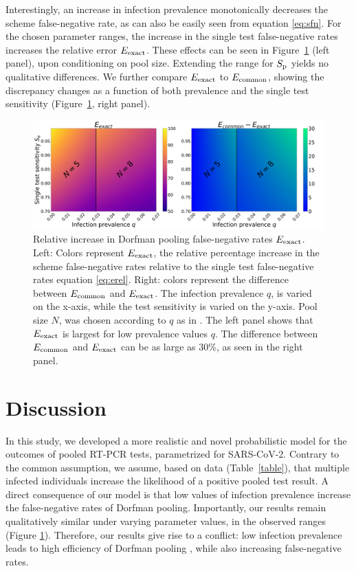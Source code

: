 \documentclass{article}
\begin{document}
Interestingly, an increase in infection prevalence monotonically
decreases the scheme false-negative rate, as can also be easily seen
from equation \eqref{eq:sfn}. For the chosen parameter ranges, the increase in
the single test false-negative rates increases the relative error
$E_{\text{{exact}}}$. These effects can be seen in Figure~\ref{fig1} (left
panel), upon conditioning on pool size. Extending the range for $S_\text{p}$
yields no qualitative differences. We further compare $E_{\text{{exact}}}$ to
$E_{\text{{common}}}$, showing the discrepancy changes as a function of both
prevalence and the single test sensitivity (Figure~\ref{fig1}, right
panel).
\begin{figure}[H]
  \centering
  \includegraphics[width=\textwidth]{heatmap_sfn.jpg}
  \caption{Relative increase in Dorfman pooling false-negative rates
    $E_{\text{{exact}}}$. Left: Colors represent $E_{\text{{exact}}}$, the relative
    percentage increase in the scheme false-negative rates relative to
    the single test false-negative rates equation \eqref{eq:erel}. Right:
    colors represent the difference between $E_{\text{{common}}}$ and
    $E_{\text{{exact}}}$. The infection prevalence $q$, is varied on the
    x-axis, while the test sensitivity is varied on the y-axis. Pool
    size $N$, was chosen according to $q$ as in
    \cite{DorfmanYuvalDor}. The left panel shows that $E_{\text{{exact}}}$ is
    largest for low prevalence values $q$. The difference between
    $E_{\text{{common}}}$ and $E_{\text{{exact}}}$ can be as large as 30\%, as seen
    in the right panel. }\label{fig1}
\end{figure}

\section*{Discussion}
In this study, we developed a more realistic and novel probabilistic
model for the outcomes of pooled RT-PCR tests, parametrized for
SARS-CoV-2. Contrary to the common assumption, we assume, based on
data (Table~\ref{table}), that multiple infected individuals increase
the likelihood of a positive pooled test result. A direct consequence
of our model is that low values of infection prevalence increase the
false-negative rates of Dorfman pooling. Importantly, our results
remain qualitatively similar under varying parameter values, in the
observed ranges \cite{KitComparison,EstimatingRatesKucrika,
  EstimatingRatesLourenco, InterpretingCOVID19Test} (Figure
\ref{fig1}). Therefore, our results give rise to a conflict: low
infection prevalence leads to high efficiency of Dorfman pooling
\cite{DorfmanYuvalDor}, while also increasing false-negative rates.
\end{document}
